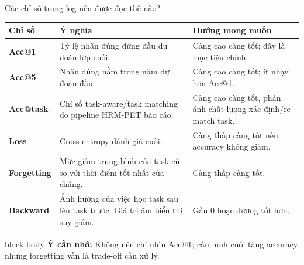 \documentclass[aspectratio=169,11pt]{beamer}
\newcommand{\remember}[1]{%
  \vfill
  \begin{beamercolorbox}[wd=\textwidth,sep=0.22cm,rounded=true]{block body}
    \textbf{Ý cần nhớ:} #1
  \end{beamercolorbox}
}
\begin{document}
\begin{frame}{Các chỉ số trong log nên được đọc thế nào?}
  \small
  \begin{tabularx}{\textwidth}{>{\bfseries}p{2.25cm} X p{4.2cm}}
    \toprule
    Chỉ số & Ý nghĩa & Hướng mong muốn \\
    \midrule
    Acc@1 & Tỷ lệ nhãn đúng đứng đầu dự đoán lớp cuối. & Càng cao càng tốt; đây là mục tiêu chính. \\
    Acc@5 & Nhãn đúng nằm trong năm dự đoán đầu. & Càng cao càng tốt; ít nhạy hơn Acc@1. \\
    Acc@task & Chỉ số task-aware/task matching do pipeline HRM-PET báo cáo. & Càng cao càng tốt, phản ánh chất lượng xác định/re-match task. \\
    Loss & Cross-entropy đánh giá cuối. & Càng thấp càng tốt nếu accuracy không giảm. \\
    Forgetting & Mức giảm trung bình của task cũ so với thời điểm tốt nhất của chúng. & Càng thấp càng tốt. \\
    Backward & Ảnh hưởng của việc học task sau lên task trước. Giá trị âm biểu thị suy giảm. & Gần 0 hoặc dương tốt hơn. \\
    \bottomrule
  \end{tabularx}
  \remember{Không nên chỉ nhìn Acc@1; cấu hình cuối tăng accuracy nhưng forgetting vẫn là trade-off cần xử lý.}
\end{frame}
\end{document}
